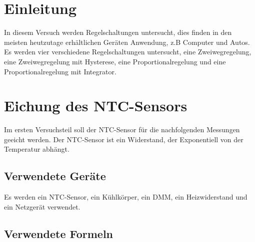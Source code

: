 \documentclass[12pt,a4paper]{article}
\begin{document}
\section{Einleitung}

In diesem Versuch werden Regelschaltungen untersucht, dies finden in den meisten heutzutage erhältlichen Geräten Anwendung, z.B Computer und Autos. Es werden vier verschiedene Regelschaltungen untersucht, eine Zweiwegregelung, eine Zweiwegregelung mit Hysterese, eine Proportionalregelung und eine Proportionalregelung mit Integrator.


\section{Eichung des NTC-Sensors}
Im ersten Versuchsteil soll der NTC-Sensor für die nachfolgenden Messungen geeicht werden. Der NTC-Sensor ist ein Widerstand, der Exponentiell von der Temperatur abhängt.

\subsection{Verwendete Geräte}

Es werden ein NTC-Sensor, ein Kühlkörper, ein DMM, ein Heizwiderstand und ein Netzgerät verwendet.

\subsection{Verwendete Formeln}
\end{document}
